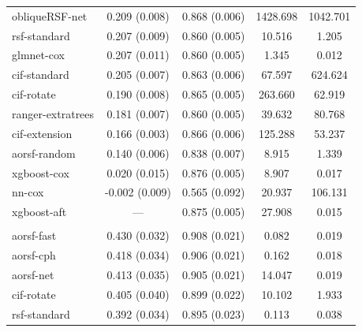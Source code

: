 \documentclass{article}\usepackage[]{graphicx}\usepackage[]{xcolor}
\newenvironment{knitrout}{}{} %
\begin{document}
\begin{knitrout}
\begin{longtable}[t]{lcccc}
\hspace{1em}obliqueRSF-net & 0.209 (0.008) & 0.868 (0.006) & 1428.698 & 1042.701\\
\hspace{1em}rsf-standard & 0.207 (0.009) & 0.860 (0.005) & 10.516 & 1.205\\
\hspace{1em}glmnet-cox & 0.207 (0.011) & 0.860 (0.005) & 1.345 & 0.012\\
\hspace{1em}cif-standard & 0.205 (0.007) & 0.863 (0.006) & 67.597 & 624.624\\
\hspace{1em}cif-rotate & 0.190 (0.008) & 0.865 (0.005) & 263.660 & 62.919\\
\hspace{1em}ranger-extratrees & 0.181 (0.007) & 0.860 (0.005) & 39.632 & 80.768\\
\hspace{1em}cif-extension & 0.166 (0.003) & 0.866 (0.006) & 125.288 & 53.237\\
\hspace{1em}aorsf-random & 0.140 (0.006) & 0.838 (0.007) & 8.915 & 1.339\\
\hspace{1em}xgboost-cox & 0.020 (0.015) & 0.876 (0.005) & 8.907 & 0.017\\
\hspace{1em}nn-cox & -0.002 (0.009) & 0.565 (0.092) & 20.937 & 106.131\\
\hspace{1em}xgboost-aft & --- & 0.875 (0.005) & 27.908 & 0.015\\
\addlinespace[0.3em]
\multicolumn{5}{l}{\textit{\textbf{Primary biliary cholangitis; death, n = 276, p = 19}}}\\
\hline
\hspace{1em}aorsf-fast & 0.430 (0.032) & 0.908 (0.021) & 0.082 & 0.019\\
\hspace{1em}aorsf-cph & 0.418 (0.034) & 0.906 (0.021) & 0.162 & 0.018\\
\hspace{1em}aorsf-net & 0.413 (0.035) & 0.905 (0.021) & 14.047 & 0.019\\
\hspace{1em}cif-rotate & 0.405 (0.040) & 0.899 (0.022) & 10.102 & 1.933\\
\hspace{1em}rsf-standard & 0.392 (0.034) & 0.895 (0.023) & 0.113 & 0.038\\

\end{longtable}
\end{knitrout}
\end{document}
